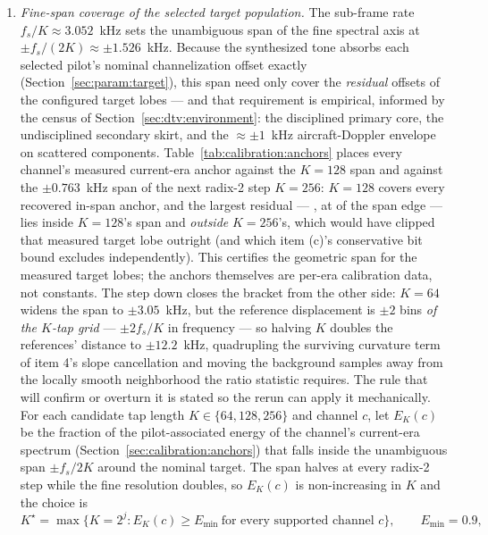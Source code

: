 \begin{enumerate}
\begin{enumerate}
        \item \emph{Fine-span coverage of the selected target population.} The sub-frame rate $f_s / K \approx 3.052$~kHz sets the unambiguous span of the fine spectral axis at $\pm f_s/(2K) \approx \pm 1.526$~kHz. Because the synthesized tone absorbs each selected pilot's nominal channelization offset exactly (Section~\ref{sec:param:target}), this span need only cover the \emph{residual} offsets of the configured target lobes --- and that requirement is empirical, informed by the census of Section~\ref{sec:dtv:environment}: the disciplined primary core, the undisciplined secondary skirt, and the ${\approx}\pm 1$~kHz aircraft-Doppler envelope on scattered components. Table~\ref{tab:calibration:anchors} places every channel's measured current-era anchor against the $K = 128$ span and against the $\pm 0.763$~kHz span of the next radix-2 step $K = 256$: $K = 128$ covers every recovered in-span anchor, and the largest residual --- , at  of the span edge --- lies inside $K = 128$'s span and \emph{outside} $K = 256$'s, which would have clipped that measured target lobe outright (and which item (c)'s conservative bit bound excludes independently). This certifies the geometric span for the measured target lobes; the anchors themselves are per-era calibration data, not constants. The step down closes the bracket from the other side: $K = 64$ widens the span to $\pm 3.05$~kHz, but the reference displacement is $\pm 2$ bins \emph{of the $K$-tap grid} --- $\pm 2 f_s/K$ in frequency --- so halving $K$ doubles the references' distance to $\pm 12.2$~kHz, quadrupling the surviving curvature term of item 4's slope cancellation and moving the background samples away from the locally smooth neighborhood the ratio statistic requires. The rule that will confirm or overturn it is stated so the rerun can apply it mechanically. For each candidate tap length $K \in \{64, 128, 256\}$ and channel $c$, let $E_K(c)$ be the fraction of the pilot-associated energy of the channel's current-era spectrum (Section~\ref{sec:calibration:anchors}) that falls inside the unambiguous span $\pm f_s/2K$ around the nominal target. The span halves at every radix-2 step while the fine resolution doubles, so $E_K(c)$ is non-increasing in $K$ and the choice is
\begin{equation}
\label{eq:param:kstar}
K^\star = \max\bigl\{K = 2^j : E_K(c) \ge E_{\min}\ \text{for every supported channel } c\bigr\},
\qquad E_{\min} = 0.9,
\end{equation}

\end{enumerate}
\end{enumerate}

